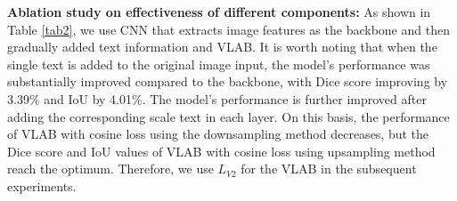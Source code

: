 \documentclass{article}
\begin{document}
\begin{table}[!ht]
\centering
\caption{Ablation study on effectiveness of different components on QaTa-COVID dataset.}
\label{tab2}
\vspace{-2mm}
\end{table}

\noindent\textbf{Ablation study on effectiveness of different components: } As shown in Table \ref{tab2}, we use CNN that extracts image features as the backbone and then gradually added text information and VLAB. It is worth noting that when the single text is added to the original image input, the model's performance was substantially improved compared to the backbone, with Dice score improving by 3.39\% and IoU by 4.01\%. The model's performance is further improved after adding the corresponding scale text in each layer. On this basis, the performance of VLAB with cosine loss using the downsampling method decreases, but the Dice score and IoU values of VLAB with cosine loss using upsampling method reach the optimum. Therefore, we use $L_{V2}$ for the VLAB in the subsequent experiments.
\vspace{-4mm}
\end{document}
